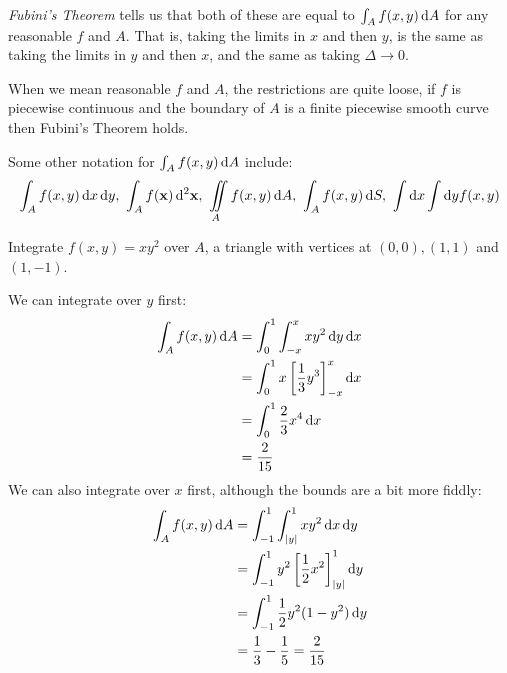 \documentclass[../main.tex]{subfiles}
\begin{document}
\textit{Fubini's Theorem} tells us that both of these are equal to $\int_A f(x, y) \d{A}$ for any reasonable $f$ and $A$.
That is, taking the limits in $x$ and then $y$, is the same as taking the limits in $y$ and then $x$, and the same as taking $\Delta \to 0$.
\begin{remark}
  \nonexaminable
  When we mean reasonable $f$ and $A$, the restrictions are quite loose, if $f$ is piecewise continuous and the boundary of $A$ is a finite piecewise smooth curve then Fubini's Theorem holds.
\end{remark}
\begin{remark}[Notation]
  Some other notation for $\int_A f(x, y) \d{A}$  include:
  \[
    \int_A f(x, y) \d{x} \d{y},\ \int_A f(\vec{x}) \d^2{\vec{x}},\ \iint\limits_A f(x, y) \d{A},\ \int_A f(x, y) \d{S},\ \int\d{x}\int\d{y} f(x, y)
  \]
\end{remark}
\begin{example}
  Integrate $f(x, y) = xy^2$ over $A$, a triangle with vertices at $(0, 0), (1, 1)$ and $(1, -1)$.

  \begin{center}
  \end{center}

  We can integrate over $y$ first:
  \begin{align*}
    \int_A f(x, y) \d{A} &= \int_{0}^{1} \int_{-x}^{x} xy^2 \d{y} \d{x} \\
                         &= \int_{0}^{1} x \eval{\frac{1}{3} y^3}{-x}{x} \d{x} \\
                         &= \int_{0}^{1} \frac{2}{3}x^{4} \d{x} \\
                         &= \frac{2}{15}
  \end{align*}
  We can also integrate over $x$ first, although the bounds are a bit more fiddly:
  \begin{align*}
    \int_A f(x, y) \d{A} &= \int_{-1}^{1} \int_{|y|}^{1} xy^2 \d{x} \d{y} \\
                         &= \int_{-1}^{1} y^2 \eval{\frac{1}{2}x^2}{|y|}{1} \d{y} \\
                         &= \int_{-1}^{1} \frac{1}{2}y^2(1 - y^2) \d{y} \\
                         &= \frac{1}{3} - \frac{1}{5} = \frac{2}{15}
  \end{align*}
\end{example}
\end{document}
